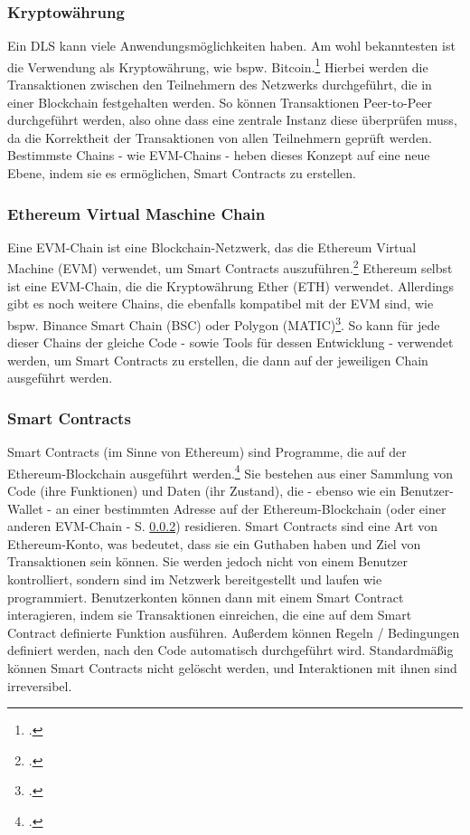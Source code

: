 \subsubsection{Kryptowährung}
\label{sec:definition-kryptowaehrung}
Ein DLS kann viele Anwendungsmöglichkeiten haben. Am wohl bekanntesten ist die Verwendung als Kryptowährung, wie bspw. Bitcoin.\footcite[Vgl. hierzu und im Folgenden][1]{q4} 
Hierbei werden die Transaktionen zwischen den Teilnehmern des Netzwerks durchgeführt, die in einer Blockchain festgehalten werden. 
So können Transaktionen Peer-to-Peer durchgeführt werden, also ohne dass eine zentrale Instanz diese überprüfen muss, da die Korrektheit der Transaktionen von allen Teilnehmern geprüft werden.
\bigbreak
\noindent
Bestimmste Chains - wie EVM-Chains - heben dieses Konzept auf eine neue Ebene, indem sie es ermöglichen, Smart Contracts zu erstellen.

\subsubsection{Ethereum Virtual Maschine Chain}
\label{sec:definition-evm-chain}
Eine EVM-Chain ist eine Blockchain-Netzwerk, das die Ethereum Virtual Machine (EVM) verwendet, um Smart Contracts auszuführen.\footcite[Vgl. hierzu und im Folgenden][]{w5}
Ethereum selbst ist eine EVM-Chain, die die Kryptowährung Ether (ETH) verwendet. Allerdings gibt es noch weitere Chains, die ebenfalls kompatibel mit der EVM sind, wie bspw. Binance Smart Chain (BSC) oder Polygon (MATIC)\footcite[Vgl.][]{w6}.
So kann für jede dieser Chains der gleiche Code - sowie Tools für dessen Entwicklung - verwendet werden, um Smart Contracts zu erstellen, die dann auf der jeweiligen Chain ausgeführt werden.

\subsubsection{Smart Contracts}
\label{sec:definition-smart-contracts}

Smart Contracts (im Sinne von Ethereum) sind Programme, die auf der Ethereum-Blockchain ausgeführt werden.\footcite[Vgl. hierzu und im Folgenden][]{w4} 
Sie bestehen aus einer Sammlung von Code (ihre Funktionen) und Daten (ihr Zustand), die - ebenso wie ein Benutzer-Wallet - an einer bestimmten Adresse auf der Ethereum-Blockchain (oder einer anderen EVM-Chain - S. \ref{sec:definition-evm-chain}) residieren.
Smart Contracts sind eine Art von Ethereum-Konto, was bedeutet, dass sie ein Guthaben haben und Ziel von Transaktionen sein können. 
Sie werden jedoch nicht von einem Benutzer kontrolliert, sondern sind im Netzwerk bereitgestellt und laufen wie programmiert. 
Benutzerkonten können dann mit einem Smart Contract interagieren, indem sie Transaktionen einreichen, die eine auf dem Smart Contract definierte Funktion ausführen. 
Außerdem können Regeln / Bedingungen definiert werden, nach den Code automatisch durchgeführt wird.
Standardmäßig können Smart Contracts nicht gelöscht werden, und Interaktionen mit ihnen sind irreversibel.

